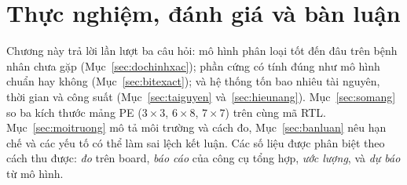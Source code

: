 \chapter{Thực nghiệm, đánh giá và bàn luận}\label{ch:thucnghiem}

Chương này trả lời lần lượt ba câu hỏi: mô hình phân loại tốt đến đâu trên bệnh nhân chưa gặp (Mục~\ref{sec:dochinhxac}); phần cứng có tính đúng như mô hình chuẩn hay không (Mục~\ref{sec:bitexact}); và hệ thống tốn bao nhiêu tài nguyên, thời gian và công suất (Mục~\ref{sec:taiguyen} và~\ref{sec:hieunang}).
Mục~\ref{sec:somang} so ba kích thước mảng PE ($3\times3$, $6\times8$, $7\times7$) trên cùng mã RTL.
Mục~\ref{sec:moitruong} mô tả môi trường và cách đo, Mục~\ref{sec:banluan} nêu hạn chế và các yếu tố có thể làm sai lệch kết luận.
Các số liệu được phân biệt theo cách thu được: \emph{đo} trên board, \emph{báo cáo} của công cụ tổng hợp, \emph{ước lượng}, và \emph{dự báo} từ mô hình.








